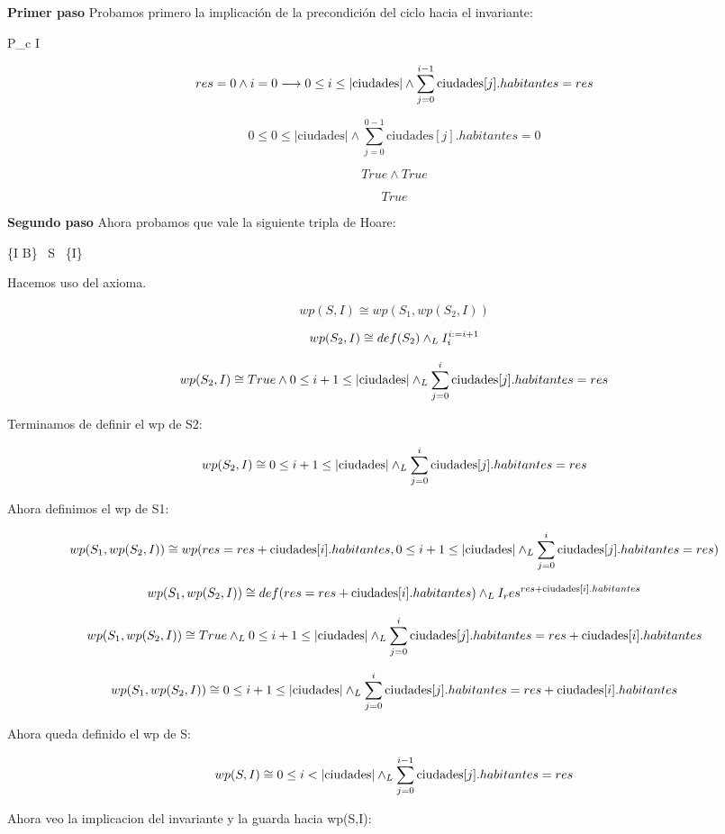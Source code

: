 \documentclass[10pt,a4paper]{article}
\begin{document}
\textbf{Primer paso} Probamos primero la implicación de la precondición del ciclo hacia el invariante:

P_c \implica I

\[
res = 0 \land i = 0 \longrightarrow 0 \leq i \leq |\text{ciudades}| \land \sum_{j=0}^{i-1} \text{ciudades}[j].habitantes = res
\]

\[
 0 \leq 0 \leq |\text{ciudades}| \land \sum_{j=0}^{0-1} \text{ciudades}[j].habitantes = 0
\]

\[
True \land True
\]

\[
True
\]

\textbf{Segundo paso} Ahora probamos que vale la siguiente tripla de Hoare:

\{I \land B\} \ S \ \{I\}

Hacemos uso del axioma.

\[
wp(S, I) \cong wp(S_1, wp(S_2, I))
\]

\[
wp(S_2, I) \cong def(S_2) \land _L I_i^{i := i+1}
\]

\[
wp(S_2, I) \cong True \land 0 \leq i+1 \leq |\text{ciudades}| \land _L \sum_{j=0}^{i} \text{ciudades}[j].habitantes = res
\]

Terminamos de definir el wp de S2:

\[
wp(S_2, I) \cong 0 \leq i+1 \leq |\text{ciudades}| \land _L \sum_{j=0}^{i} \text{ciudades}[j].habitantes = res
\]

Ahora definimos el wp de S1:

\[
wp(S_1, wp(S_2, I)) \cong wp(res = res + \text{ciudades}[i].habitantes, 0 \leq i+1 \leq |\text{ciudades}| \land _L \sum_{j=0}^{i} \text{ciudades}[j].habitantes = res)
\]

\[
wp(S_1, wp(S_2, I)) \cong def(res = res + \text{ciudades}[i].habitantes) \land _L I_res^{res + \text{ciudades}[i].habitantes}
\]

\[
wp(S_1, wp(S_2, I)) \cong True \land _L 0 \leq i+1 \leq |\text{ciudades}| \land _L \sum_{j=0}^{i} \text{ciudades}[j].habitantes = res + \text{ciudades}[i].habitantes
\]

\[
wp(S_1, wp(S_2, I)) \cong 0 \leq i+1 \leq |\text{ciudades}| \land _L \sum_{j=0}^{i} \text{ciudades}[j].habitantes = res + \text{ciudades}[i].habitantes
\]

Ahora queda definido el wp de S:

\[
wp(S, I) \cong 0 \leq i < |\text{ciudades}| \land _L \sum_{j=0}^{i-1} \text{ciudades}[j].habitantes = res
\]

Ahora veo la implicacion del invariante y la guarda hacia wp(S,I):
\end{document}
